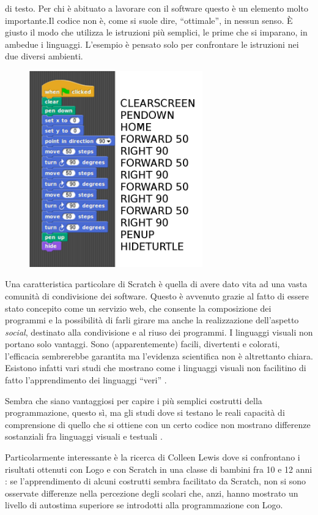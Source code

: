 di testo. Per chi è abituato a lavorare con il software questo è un elemento molto importante.Il codice non è, come si suole dire, “ottimale”, in nessun senso. È giusto il modo che utilizza le istruzioni più semplici, le prime che si imparano, in ambedue i linguaggi. L'esempio è pensato solo per confrontare le istruzioni nei due diversi ambienti. 
\begin{figure}
   \centering
   \includegraphics[width=7.5cm]{./images/librelogo/scratch-2.png}
   \label{scratch}
\end{figure}

Una caratteristica particolare di Scratch è quella di avere dato vita ad una vasta comunità di condivisione dei software. Questo è avvenuto grazie al fatto di essere stato concepito come un servizio web, che consente la composizione dei programmi e la possibilità di farli girare ma anche la realizzazione dell'aspetto \textit{social}, destinato alla condivisione e al riuso dei programmi. 
I linguaggi visuali non portano solo vantaggi. Sono (apparentemente) facili, divertenti e colorati, l'efficacia sembrerebbe garantita ma l'evidenza scientifica non è altrettanto chiara. Esistono infatti vari studi che mostrano come i linguaggi visuali non facilitino di fatto l'apprendimento dei linguaggi “veri” \cite{Weintrop}. 

Sembra che siano vantaggiosi per capire i più semplici costrutti della programmazione, questo sì, ma gli studi dove si testano le reali capacità di comprensione di quello che si ottiene con un certo codice non mostrano differenze sostanziali fra linguaggi visuali e testuali \cite{Weintrop2}. 

Particolarmente interessante è la ricerca di Colleen Lewis dove si confrontano i risultati ottenuti con Logo e con Scratch in una classe di bambini fra 10 e 12 anni \cite{Lewis}: se l'apprendimento di alcuni costrutti sembra facilitato da Scratch, non si sono osservate differenze nella percezione degli scolari che, anzi, hanno mostrato un livello di autostima superiore se introdotti alla programmazione con Logo. 

